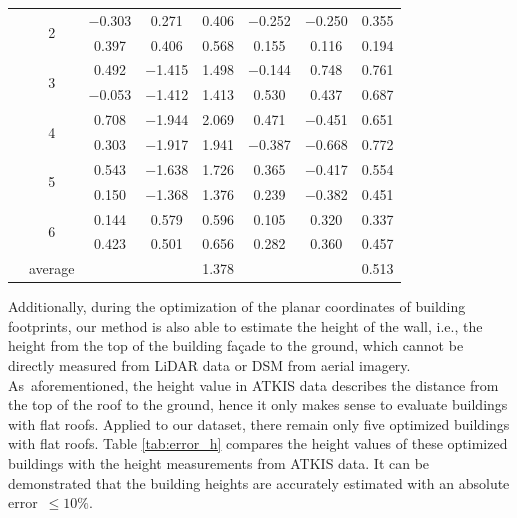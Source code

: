 \begin{table}[H]
\begin{tabular}{cccccccc}
\cline{2-8}          & \multirow{2}[2]{*}{2} & $-$0.303 & 0.271 & 0.406 & $-$0.252 & $-$0.250 & 0.355 \\
          &       & 0.397 & 0.406 & 0.568 & 0.155 & 0.116 & 0.194 \\
\cline{2-8}          & \multirow{2}[2]{*}{3} & 0.492 & $-$1.415 & 1.498 & $-$0.144 & 0.748 & 0.761 \\
          &       & $-$0.053 & $-$1.412 & 1.413 & 0.530 & 0.437 & 0.687 \\
\cline{2-8}          & \multirow{2}[2]{*}{4} & 0.708 & $-$1.944 & 2.069 & 0.471 & $-$0.451 & 0.651 \\
          &       & 0.303 & $-$1.917 & 1.941 & $-$0.387 & $-$0.668 & 0.772 \\
\cline{2-8}          & \multirow{2}[2]{*}{5} & 0.543 & $-$1.638 & 1.726 & 0.365 & $-$0.417 & 0.554 \\
          &       & 0.150 & $-$1.368 & 1.376 & 0.239 & $-$0.382 & 0.451 \\
\cline{2-8}          & \multirow{2}[2]{*}{6} & 0.144 & 0.579 & 0.596 & 0.105 & 0.320 & 0.337 \\
          &       & 0.423 & 0.501 & 0.656 & 0.282 & 0.360 & 0.457 \\
\cline{2-8}          & average  &       &       & 1.378 &       &       & 0.513 \\
    \bottomrule
    \end{tabular}%
  \label{tab:error_xy}%
\end{table}%


Additionally, during the optimization of the planar coordinates of building footprints, our method is also able to estimate the height of the wall, i.e., the height from the top of the building fa\c{c}ade to the ground, which cannot be directly measured from LiDAR data or DSM from aerial imagery. As~aforementioned, the height value in ATKIS data describes the distance from the top of the roof to the ground, hence it only makes sense to evaluate buildings with flat roofs. Applied to our dataset, there remain only five optimized buildings with flat roofs. Table \ref{tab:error_h} compares the height values of these optimized buildings with the height measurements from ATKIS data. It can be demonstrated that the building heights are accurately estimated with an absolute error~$\leq10\%$.
 



